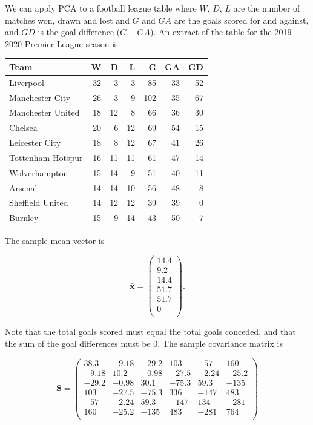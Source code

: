 \documentclass[
]{book}
\theoremstyle{definition}
\theoremstyle{definition}
\theoremstyle{definition}
\theoremstyle{definition}
\theoremstyle{remark}
\begin{document}
We can apply PCA to a football league table where \(W\), \(D\), \(L\) are the number of matches won, drawn and lost and \(G\) and \(GA\) are the goals scored for and against, and \(GD\) is the goal difference (\(G-GA\)). An extract of the table for the 2019-2020 Premier League season is:

\begin{tabular}{lrrrrrr}
\toprule
Team & W & D & L & G & GA & GD\\
\midrule
Liverpool & 32 & 3 & 3 & 85 & 33 & 52\\
Manchester City & 26 & 3 & 9 & 102 & 35 & 67\\
Manchester United & 18 & 12 & 8 & 66 & 36 & 30\\
Chelsea & 20 & 6 & 12 & 69 & 54 & 15\\
Leicester City & 18 & 8 & 12 & 67 & 41 & 26\\
\addlinespace
Tottenham Hotspur & 16 & 11 & 11 & 61 & 47 & 14\\
Wolverhampton & 15 & 14 & 9 & 51 & 40 & 11\\
Arsenal & 14 & 14 & 10 & 56 & 48 & 8\\
Sheffield United & 14 & 12 & 12 & 39 & 39 & 0\\
Burnley & 15 & 9 & 14 & 43 & 50 & -7\\
\bottomrule
\end{tabular}

The sample mean vector is

\[\bar{\mathbf x} =\begin{pmatrix}14.4 \\9.2 \\14.4 \\51.7 \\51.7 \\0 \\\end{pmatrix}.\]

Note that the total goals scored must equal the total goals conceded, and that the sum of the goal differences must be \(0\). The sample covariance matrix is

\begin{equation}
\mathbf S= \begin{pmatrix}38.3&-9.18&-29.2&103&-57&160 \\-9.18&10.2&-0.98&-27.5&-2.24&-25.2 \\-29.2&-0.98&30.1&-75.3&59.3&-135 \\103&-27.5&-75.3&336&-147&483 \\-57&-2.24&59.3&-147&134&-281 \\160&-25.2&-135&483&-281&764 \\\end{pmatrix}
\label{eq:PLES}
\end{equation}
\end{document}
